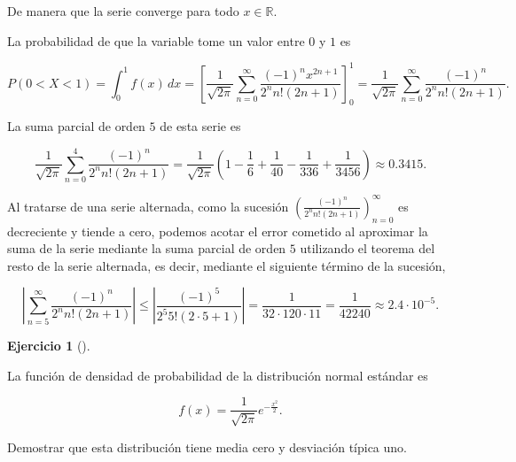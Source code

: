 \documentclass[
  spanish,
  a4paper,
]{scrreport}
\theoremstyle{definition}
\newtheorem{exercise}{Ejercicio}[chapter]
\theoremstyle{remark}
\begin{document}
\begin{tcolorbox}
De manera que la serie converge para todo \(x \in \mathbb{R}\).

La probabilidad de que la variable tome un valor entre \(0\) y \(1\) es

\[
P(0 < X < 1) 
= \int_0^1 f(x)\,dx
= \left[\frac{1}{\sqrt{2\pi}}\sum_{n=0}^\infty \frac{(-1)^n x^{2n+1}}{2^n n!(2n+1)}\right]_0^1 
= \frac{1}{\sqrt{2\pi}}\sum_{n=0}^\infty \frac{(-1)^n}{2^n n!(2n+1)}.
\]

La suma parcial de orden \(5\) de esta serie es

\[
\frac{1}{\sqrt{2\pi}}\sum_{n=0}^4 \frac{(-1)^n}{2^n n!(2n+1)}
= \frac{1}{\sqrt{2\pi}} \left( 1 - \frac{1}{6} + \frac{1}{40} - \frac{1}{336} + \frac{1}{3456} \right)
\approx 0.3415.
\]

Al tratarse de una serie alternada, como la sucesión
\(\left(\frac{(-1)^n}{2^n n!(2n+1)}\right)_{n=0}^\infty\) es decreciente
y tiende a cero, podemos acotar el error cometido al aproximar la suma
de la serie mediante la suma parcial de orden \(5\) utilizando el
teorema del resto de la serie alternada, es decir, mediante el siguiente
término de la sucesión,

\[
\left|\sum_{n=5}^\infty \frac{(-1)^n}{2^n n!(2n+1)}\right| 
\leq \left| \frac{(-1)^5}{2^5 5!(2\cdot 5 + 1)} \right|
= \frac{1}{32 \cdot 120 \cdot 11}
= \frac{1}{42240}
\approx 2.4 \cdot 10^{-5}.
\]

\end{tcolorbox}

\begin{exercise}[]\protect\hypertarget{exr-7}{}\label{exr-7}

La función de densidad de probabilidad de la distribución normal
estándar es

\[
f(x) = \frac{1}{\sqrt{2\pi}} e^{-\frac{x^2}{2}}.
\]

Demostrar que esta distribución tiene media cero y desviación típica
uno.

\end{exercise}
\end{document}

